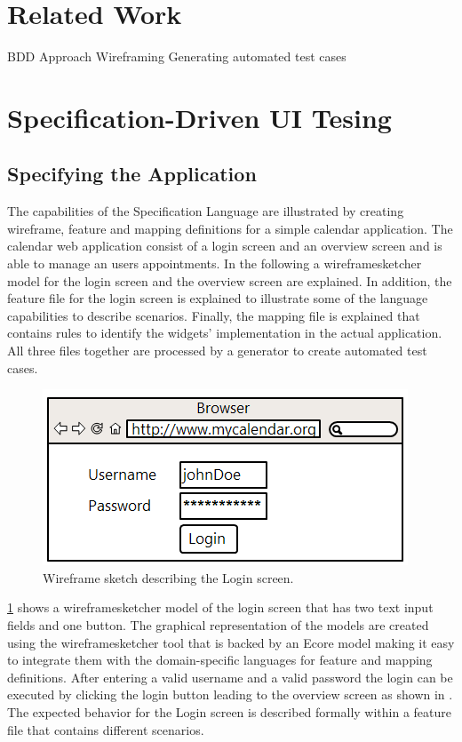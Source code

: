\documentclass{sig-alternate-05-2015}
\begin{document}
\section{Related Work}\label{sec:RelatedWork}
BDD Approach
Wireframing
Generating automated test cases


\section{Specification-Driven UI Tesing}\label{sec:SpecificationDrivenUITesting}
\subsection{Specifying the Application}\label{sec:SpecifyingTheApplication} 
The capabilities of the Specification Language are illustrated by creating wireframe, feature and mapping definitions for a simple calendar application.
The calendar web application consist of a login screen and an overview screen and is able to manage an users appointments. 
In the following a wireframesketcher model for the login screen and the overview screen are explained.
In addition, the feature file for the login screen is explained to illustrate some of the language capabilities to describe scenarios.
Finally, the mapping file is explained that contains rules to identify the widgets' implementation in the actual application.
All three files together are processed by a generator to create automated test cases.
\begin{figure}[h]
	\centering
	\includegraphics[width=0.8\linewidth]{Login.png}
	\caption{Wireframe sketch describing the Login screen.}
	\label{fig:login}
\end{figure}

\cref{fig:login} shows a wireframesketcher model of the login screen that has two text input fields and one button.
The graphical representation of the models are created using the wireframesketcher tool that is backed by an Ecore model making it easy to integrate them with the domain-specific languages for feature and mapping definitions.
After entering a valid username and a valid password the login can be executed by clicking the login button leading to the overview screen as shown in .
The expected behavior for the Login screen is described formally within a feature file that contains different scenarios.
\end{document}
